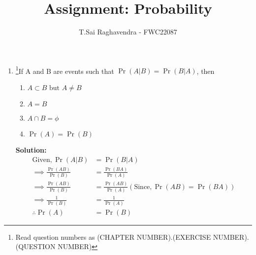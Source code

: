 \documentclass{article}
\providecommand{\pr}[1]{\ensuremath{\Pr\left(#1\right)}}
\newcommand{\solution}{\noindent \textbf{Solution: }}
\begin{document}
\title{Assignment: Probability}
\author{\Large T.Sai Raghavendra - FWC22087}
\date{}


\maketitle
\begin{enumerate}[label=13.\arabic{enumi}.\arabic{enumii}]%
\setcounter{enumi}{0}
\setcounter{enumii}{17}


\item \footnote{Read question numbers as (CHAPTER NUMBER).(EXERCISE NUMBER).(QUESTION NUMBER)}If A and B are events such that $\pr{A|B} = \pr{B|A}$, then\\
\begin{enumerate}
\item $A \subset B \text{ but } A \not= B$
\item $A = B$
\item $A \cap B = \phi$
\item $\pr{A}=\pr{B}$
\end{enumerate}

\solution \begin{align}
\text{Given}, \pr{A|B} &= \pr{B|A}\\
\implies  \frac{\pr{AB}}{\pr{B}} &= \frac{\pr{BA}}{\pr{A}}\\ 
\implies  \frac{\pr{AB}}{\pr{B}} &= \frac{\pr{AB}}{\pr{A}} (\text{Since}, \pr{AB} = \pr{BA})\\
\implies  \frac{1}{\pr{B}} &= \frac{1}{\pr{A}}\\
\therefore  \pr{A} &= \pr{B}
\end{align}
\end{enumerate}
\end{document}
